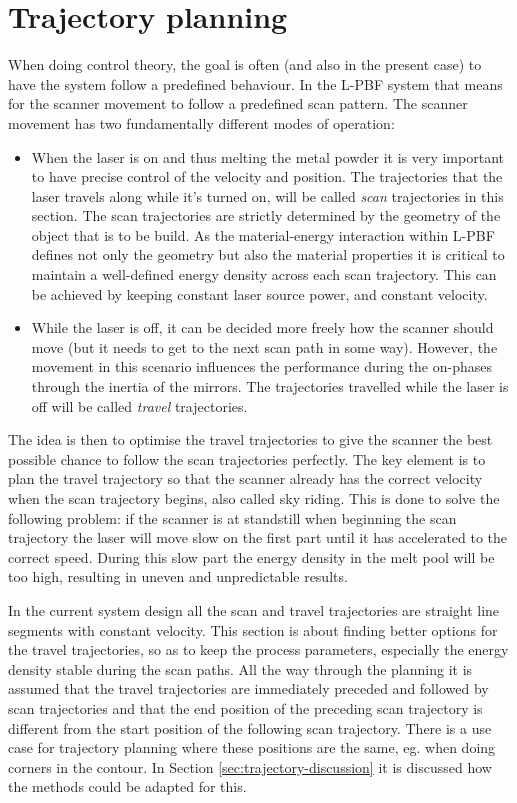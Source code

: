 \chapter{Trajectory planning}

When doing control theory, the goal is often (and also in the present case) to have the system follow a predefined behaviour. In the L-PBF system that means for the scanner movement to follow a predefined scan pattern. The scanner movement has two fundamentally different modes of operation:
\begin{itemize}
    \item When the laser is on and thus melting the metal powder it is very important to have precise control of the velocity and position. The trajectories that the laser travels along while it's turned on, will be called \textit{scan} trajectories in this section. The scan trajectories are strictly determined by the geometry of the object that is to be build. As the material-energy interaction within L-PBF defines not only the geometry but also the material properties it is critical to maintain a well-defined energy density across each scan trajectory. This can be achieved by keeping constant laser source power, and constant velocity.
    \item While the laser is off, it can be decided more freely how the scanner should move (but it needs to get to the next scan path in some way). However, the movement in this scenario influences the performance during the on-phases through the inertia of the mirrors. The trajectories travelled while the laser is off will be called \textit{travel} trajectories.
\end{itemize}

The idea is then to optimise the travel trajectories to give the scanner the best possible chance to follow the scan trajectories perfectly. The key element is to plan the travel trajectory so that the scanner already has the correct velocity when the scan trajectory begins, also called sky riding. This is done to solve the following problem: if the scanner is at standstill when beginning the scan trajectory the laser will move slow on the first part until it has accelerated to the correct speed. During this slow part the energy density in the melt pool will be too high, resulting in uneven and unpredictable results.

In the current system design all the scan and travel trajectories are straight line segments with constant velocity. This section is about finding better options for the travel trajectories, so as to keep the process parameters, especially the energy density stable during the scan paths. All the way through the planning it is assumed that the travel trajectories are immediately preceded and followed by scan trajectories and that the end position of the preceding scan trajectory is different from the start position of the following scan trajectory. There is a use case for trajectory planning where these positions are the same, eg. when doing corners in the contour. In Section \ref{sec:trajectory-discussion} it is discussed how the methods could be adapted for this.


